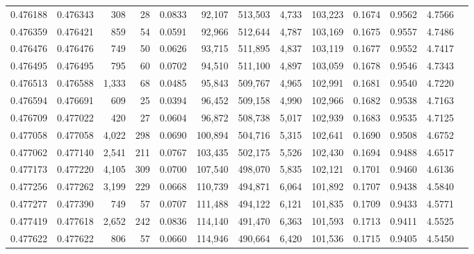 \begin{tabular}{rrrrrrrrrrrrr}
0.476188 & 0.476343 &   308 &    28 &                                     0.0833 &  92,107 & 513,503 &   4,733 & 103,223 & 0.1674 & 0.9562 & 4.7566 \\
0.476359 & 0.476421 &   859 &    54 &                                     0.0591 &  92,966 & 512,644 &   4,787 & 103,169 & 0.1675 & 0.9557 & 4.7486 \\
0.476476 & 0.476476 &   749 &    50 &                                     0.0626 &  93,715 & 511,895 &   4,837 & 103,119 & 0.1677 & 0.9552 & 4.7417 \\
0.476495 & 0.476495 &   795 &    60 &                                     0.0702 &  94,510 & 511,100 &   4,897 & 103,059 & 0.1678 & 0.9546 & 4.7343 \\
0.476513 & 0.476588 & 1,333 &    68 &                                     0.0485 &  95,843 & 509,767 &   4,965 & 102,991 & 0.1681 & 0.9540 & 4.7220 \\
0.476594 & 0.476691 &   609 &    25 &                                     0.0394 &  96,452 & 509,158 &   4,990 & 102,966 & 0.1682 & 0.9538 & 4.7163 \\
0.476709 & 0.477022 &   420 &    27 &                                     0.0604 &  96,872 & 508,738 &   5,017 & 102,939 & 0.1683 & 0.9535 & 4.7125 \\
0.477058 & 0.477058 & 4,022 &   298 &                                     0.0690 & 100,894 & 504,716 &   5,315 & 102,641 & 0.1690 & 0.9508 & 4.6752 \\
0.477062 & 0.477140 & 2,541 &   211 &                                     0.0767 & 103,435 & 502,175 &   5,526 & 102,430 & 0.1694 & 0.9488 & 4.6517 \\
0.477173 & 0.477220 & 4,105 &   309 &                                     0.0700 & 107,540 & 498,070 &   5,835 & 102,121 & 0.1701 & 0.9460 & 4.6136 \\
0.477256 & 0.477262 & 3,199 &   229 &                                     0.0668 & 110,739 & 494,871 &   6,064 & 101,892 & 0.1707 & 0.9438 & 4.5840 \\
0.477277 & 0.477390 &   749 &    57 &                                     0.0707 & 111,488 & 494,122 &   6,121 & 101,835 & 0.1709 & 0.9433 & 4.5771 \\
0.477419 & 0.477618 & 2,652 &   242 &                                     0.0836 & 114,140 & 491,470 &   6,363 & 101,593 & 0.1713 & 0.9411 & 4.5525 \\
0.477622 & 0.477622 &   806 &    57 &                                     0.0660 & 114,946 & 490,664 &   6,420 & 101,536 & 0.1715 & 0.9405 & 4.5450 \\

\end{tabular}
